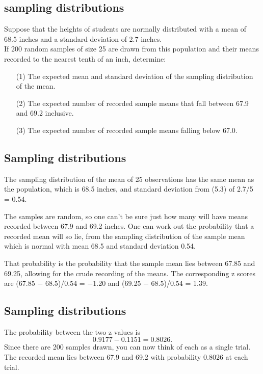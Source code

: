 
\subsection{sampling distributions}
Suppose that the heights of students are normally distributed with a
mean of 68.5 inches and a standard deviation of 2.7 inches.\\ If 200 random samples of
size 25 are drawn from this population and their means recorded to the nearest tenth
of an inch, determine:
\begin{itemize}
\item[(1)] The expected mean and standard deviation of the sampling distribution of the
mean.
\item[(2)] The expected number of recorded sample means that fall between 67.9 and 69.2
inclusive.
\item[(3)] The expected number of recorded sample means falling below 67.0.
\end{itemize}



\subsection{Sampling distributions}

The sampling distribution of the mean of 25 observations has the same mean
as the population, which is 68.5 inches, and standard deviation from (5.3) of
2.7/5 = 0.54.\\ \bigskip 

The samples are random, so one can’t be sure just how many will have means
recorded between 67.9 and 69.2 inches. One can work out the probability that
a recorded mean will so lie, from the sampling distribution of the sample mean
which is normal with mean 68.5 and standard deviation 0.54. \\ \bigskip 

That probability is the probability that the sample mean lies between 67.85 and 69.25, allowing
for the crude recording of the means. The corresponding z scores are
(67.85 − 68.5)/0.54 = −1.20 and (69.25 − 68.5)/0.54 = 1.39.


\subsection{Sampling distributions}
The probability between the two z values is
\[0.9177 − 0.1151 = 0.8026.\]
Since there are 200 samples drawn, you can now think of each as a single trial.
The recorded mean lies between 67.9 and 69.2 with probability 0.8026 at each
trial.

